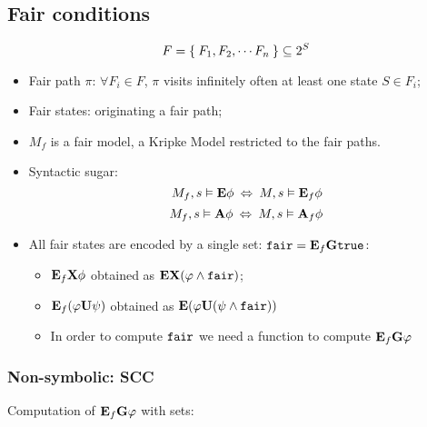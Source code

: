 \subsection{Fair conditions}

\[
    F = \Set{ F_1, F_2, \cdots F_n } \subseteq 2^S
\]

\begin{itemize}

\item   Fair path $\pi$: $\forall F_i \in F$, $\pi$ visits infinitely
        often at least one state $S \in F_i$;

\item   Fair states: originating a fair path;

\item   $M_f$ is a fair model, a Kripke Model restricted to the fair
        paths.

\item   Syntactic sugar:
        \[ M_f,s \vDash \mathcal{\mathcal{\sf \bf E}}\phi
           \:\Leftrightarrow\: M,s \vDash \mathcal{\mathcal{\sf \bf E}}_{f}{\phi} \]
        \[ M_f,s \vDash \mathcal{\mathcal{\sf \bf A}}\phi
           \:\Leftrightarrow\: M,s \vDash \mathcal{\mathcal{\sf \bf A}}_{f}{\phi} \]

\item   All fair states are encoded by a single set: $\mathcal{{\tt fair}} =
        \mathcal{\mathcal{\sf \bf E}}_{f}{\mathcal{\sf \bf G}\mathcal{{\tt true}}}$:
    \begin{itemize}
    \item   $\mathcal{\mathcal{\sf \bf E}}_{f}{\mathcal{\sf \bf X}\phi}$ obtained as $\mathcal{\mathcal{\sf \bf E}}\mathcal{\sf \bf X}(\varphi \wedge \mathcal{{\tt fair}})$;
    \item   $\mathcal{\mathcal{\sf \bf E}}_{f}{({\varphi}\mathcal{\sf \bf U}{\psi})}$ obtained as $\mathcal{\mathcal{\sf \bf E}}({\varphi}\mathcal{\sf \bf U}{(\psi \wedge
            \mathcal{{\tt fair}})})$
    \item   In order to compute $\mathcal{{\tt fair}}$ we need a function to compute
            $\mathcal{\mathcal{\sf \bf E}}_{f}{\mathcal{\sf \bf G}\varphi}$
    \end{itemize}

\end{itemize}

\subsubsection{Non-symbolic: SCC}

    Computation of $\mathcal{\mathcal{\sf \bf E}}_{f}{\mathcal{\sf \bf G}\varphi}$ with sets:

